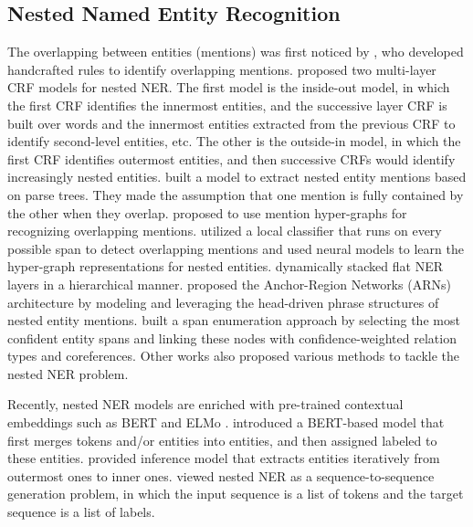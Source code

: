 \documentclass[11pt,a4paper]{article}
\begin{document}
\subsection{Nested Named Entity Recognition} 

The overlapping between entities (mentions)  was first noticed by , who 
developed handcrafted 
 rules  to identify overlapping mentions. 
  proposed two multi-layer CRF models for nested NER. The first model is the inside-out model, in which the first CRF  identifies the innermost
entities, and the successive layer CRF is built over words
and the innermost entities extracted from the previous CRF
to identify second-level entities, etc. The other is  
the outside-in model, in which the first CRF
 identifies outermost entities, and then successive CRFs would identify increasingly nested entities.
 built a model to extract nested entity mentions based on parse trees. 
They made the assumption that one mention is fully contained by the other when they overlap. 
 proposed to use mention hyper-graphs for recognizing overlapping mentions. 
 utilized a local classifier that runs on every possible span to detect overlapping mentions and 
used neural models to learn the  hyper-graph representations for nested entities. 
 dynamically stacked flat NER layers in a hierarchical manner.
 proposed the Anchor-Region Networks (ARNs) architecture by modeling and leveraging the head-driven phrase structures of nested entity mentions.
 built a span enumeration approach by selecting the most confident entity spans and linking these nodes with confidence-weighted relation types and coreferences. 
Other works \cite{muis-lu-2017-labeling,sohrab-miwa-2018-deep,zheng-etal-2019-boundary} also proposed various methods to tackle the nested NER problem.

Recently, nested NER models
are enriched with
 pre-trained contextual embeddings such as BERT \cite{devlin2018bert} and ELMo \cite{peters2018deep}.
 introduced a BERT-based model  that first merges tokens and/or entities into entities, and then assigned labeled to these entities. 
  provided inference model that extracts entities
iteratively from outermost ones to inner ones. 
 viewed nested NER as a sequence-to-sequence generation  problem, in which the input sequence is a list of tokens and the target sequence is a list of labels.
\end{document}
